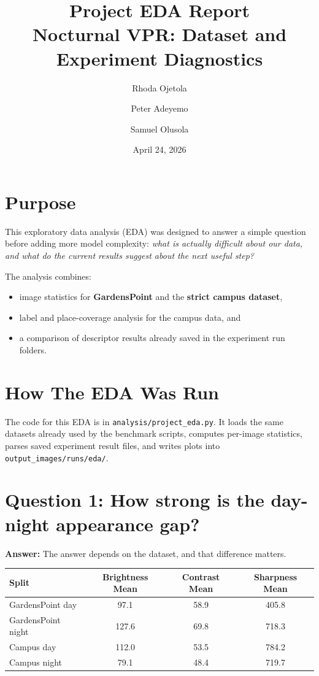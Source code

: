 \documentclass[11pt]{article}
\title{\textbf{Project EDA Report}\\[4pt]
Nocturnal VPR: Dataset and Experiment Diagnostics}
\author{Rhoda Ojetola \and Peter Adeyemo \and Samuel Olusola}
\date{April 24, 2026}
\begin{document}
\maketitle

\section*{Purpose}
This exploratory data analysis (EDA) was designed to answer a simple question before adding more model complexity: \textit{what is actually difficult about our data, and what do the current results suggest about the next useful step?}

The analysis combines:
\begin{itemize}[leftmargin=*]
  \item image statistics for \textbf{GardensPoint} and the \textbf{strict campus dataset},
  \item label and place-coverage analysis for the campus data, and
  \item a comparison of descriptor results already saved in the experiment run folders.
\end{itemize}

\section*{How The EDA Was Run}
The code for this EDA is in \texttt{analysis/project\_eda.py}. It loads the same datasets already used by the benchmark scripts, computes per-image statistics, parses saved experiment result files, and writes plots into \texttt{output\_images/runs/eda/}.

\section*{Question 1: How strong is the day-night appearance gap?}
\textbf{Answer:} The answer depends on the dataset, and that difference matters.

\begin{center}
\begin{tabular}{lccc}
\toprule
\textbf{Split} & \textbf{Brightness Mean} & \textbf{Contrast Mean} & \textbf{Sharpness Mean} \\
\midrule
GardensPoint day & 97.1 & 58.9 & 405.8 \\
GardensPoint night & 127.6 & 69.8 & 718.3 \\
Campus day & 112.0 & 53.5 & 784.2 \\
Campus night & 79.1 & 48.4 & 719.7 \\
\bottomrule
\end{tabular}
\end{center}
\end{document}
